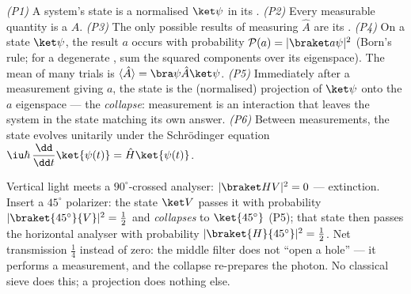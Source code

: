 \begin{theorem}\label{thm:b3:quantum-formalism:postulates}
\emph{(P1)} A system's state is a normalised  $\ket\psi$ in its
.
\emph{(P2)} Every measurable quantity is a 
$\hat A$.
\emph{(P3)} The only possible results of measuring $\hat A$ are its
.
\emph{(P4)} On a state $\ket\psi$, the result $a$ occurs with
probability $\mathcal P(a) = |\braket a\psi|^2$ (Born's rule; for a
degenerate , sum the squared components over its
eigenspace). The mean of many trials is $\langle\hat A\rangle =
\bra\psi\hat A\ket\psi$.
\emph{(P5)} Immediately after a measurement giving $a$, the state is
the (normalised) projection of $\ket\psi$ onto the $a$ eigenspace
--- the \emph{collapse}: measurement is an interaction that leaves
the system in the state matching its own answer.
\emph{(P6)} Between measurements, the state evolves unitarily under
the Schrödinger equation
$\iu\hbar\,\dfrac{\dd}{\dd t}\ket{\psi(t)} = \hat H\ket{\psi(t)}$.
\end{theorem}
\admitted

\begin{example}\label{ex:b3:quantum-formalism:threepolarizers}
Vertical light meets a $90^\circ$-crossed analyser: $|\braket
HV|^2 = 0$ --- extinction. Insert a $45^\circ$ polarizer: the state
$\ket V$ passes it with probability $|\braket{45^\circ}{V}|^2 =
\tfrac12$ and \emph{collapses} to $\ket{45^\circ}$ (P5); that state
then passes the horizontal analyser with probability
$|\braket{H}{45^\circ}|^2 = \tfrac12$. Net transmission $\tfrac14$
instead of zero: the middle filter does not ``open a hole'' --- it
performs a measurement, and the collapse re-prepares the photon. No
classical sieve does this; a projection does nothing else.
\end{example}

